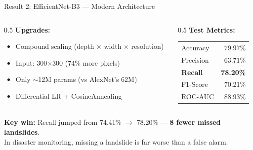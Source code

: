 \documentclass[aspectratio=169]{beamer}
\begin{document}
\begin{frame}{Result 2: EfficientNet-B3 --- Modern Architecture}
    \begin{columns}
        \begin{column}{0.5\textwidth}
            \textbf{Upgrades:}
            \begin{itemize}
                \item Compound scaling (depth $\times$ width $\times$ resolution)
                \item Input: 300$\times$300 (74\% more pixels)
                \item Only $\sim$12M params (vs AlexNet's 62M)
                \item Differential LR + CosineAnnealing
            \end{itemize}
        \end{column}
        \begin{column}{0.5\textwidth}
            \textbf{Test Metrics:}
            \begin{table}
                \centering
                \small
                \begin{tabular}{lr}
                    \toprule
                    Accuracy & 79.97\% \\
                    Precision & 63.71\% \\
                    \textbf{Recall} & \textbf{78.20\%} \\
                    F1-Score & 70.21\% \\
                    ROC-AUC & 88.93\% \\
                    \bottomrule
                \end{tabular}
            \end{table}
        \end{column}
    \end{columns}

    \vspace{0.3cm}
    \textbf{Key win:} Recall jumped from 74.41\% $\to$ 78.20\% --- \textbf{8 fewer missed landslides}. \\
    In disaster monitoring, missing a landslide is far worse than a false alarm.
\end{frame}
\end{document}
